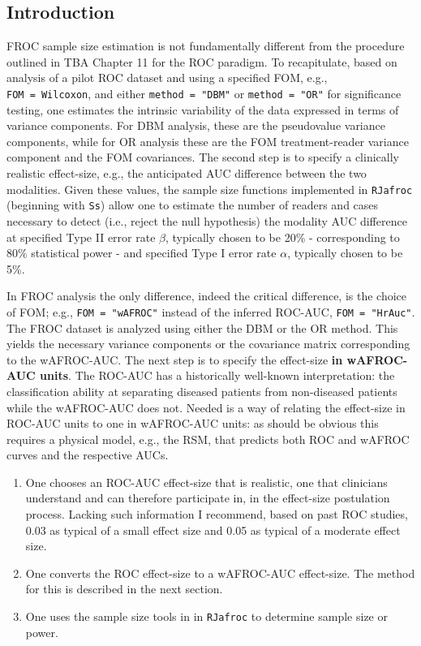\documentclass[
]{book}
\providecommand{\tightlist}{%
  \setlength{\itemsep}{0pt}\setlength{\parskip}{0pt}}
\begin{document}
\hypertarget{froc-sample-size-intro}{%
\subsection{Introduction}\label{froc-sample-size-intro}}

FROC sample size estimation is not fundamentally different from the procedure outlined in TBA Chapter 11 for the ROC paradigm. To recapitulate, based on analysis of a pilot ROC dataset and using a specified FOM, e.g., \texttt{FOM\ =\ Wilcoxon}, and either \texttt{method\ =\ "DBM"} or \texttt{method\ =\ "OR"} for significance testing, one estimates the intrinsic variability of the data expressed in terms of variance components. For DBM analysis, these are the pseudovalue variance components, while for OR analysis these are the FOM treatment-reader variance component and the FOM covariances. The second step is to specify a clinically realistic effect-size, e.g., the anticipated AUC difference between the two modalities. Given these values, the sample size functions implemented in \texttt{RJafroc} (beginning with \texttt{Ss}) allow one to estimate the number of readers and cases necessary to detect (i.e., reject the null hypothesis) the modality AUC difference at specified Type II error rate \(\beta\), typically chosen to be 20\% - corresponding to 80\% statistical power - and specified Type I error rate \(\alpha\), typically chosen to be 5\%.

In FROC analysis the only difference, indeed the critical difference, is the choice of FOM; e.g., \texttt{FOM\ =\ "wAFROC"} instead of the inferred ROC-AUC, \texttt{FOM\ =\ "HrAuc"}. The FROC dataset is analyzed using either the DBM or the OR method. This yields the necessary variance components or the covariance matrix corresponding to the wAFROC-AUC. The next step is to specify the effect-size \textbf{in wAFROC-AUC units}. The ROC-AUC has a historically well-known interpretation: the classification ability at separating diseased patients from non-diseased patients while the wAFROC-AUC does not. Needed is a way of relating the effect-size in ROC-AUC units to one in wAFROC-AUC units: as should be obvious this requires a physical model, e.g., the RSM, that predicts both ROC and wAFROC curves and the respective AUCs.

\begin{enumerate}
\def\labelenumi{\arabic{enumi}.}
\tightlist
\item
  One chooses an ROC-AUC effect-size that is realistic, one that clinicians understand and can therefore participate in, in the effect-size postulation process. Lacking such information I recommend, based on past ROC studies, 0.03 as typical of a small effect size and 0.05 as typical of a moderate effect size.
\item
  One converts the ROC effect-size to a wAFROC-AUC effect-size. The method for this is described in the next section.
\item
  One uses the sample size tools in in \texttt{RJafroc} to determine sample size or power.
\end{enumerate}
\end{document}
